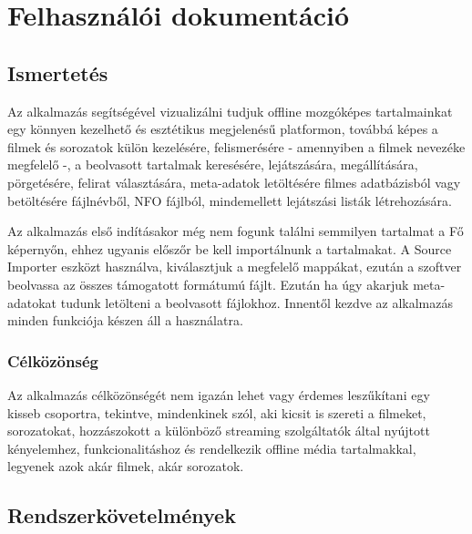 \chapter{Felhasználói dokumentáció} %
\label{ch:user}

\section{Ismertetés}
Az alkalmazás segítségével vizualizálni tudjuk offline mozgóképes tartalmainkat egy könnyen kezelhető és esztétikus megjelenésű platformon, továbbá képes a filmek és sorozatok külön kezelésére, felismerésére - amennyiben a filmek nevezéke megfelelő -, a beolvasott tartalmak keresésére, lejátszására, megállítására, pörgetésére, felirat választására, meta-adatok letöltésére filmes adatbázisból vagy betöltésére fájlnévből, NFO fájlból, mindemellett lejátszási listák létrehozására.

Az alkalmazás első indításakor még nem fogunk találni semmilyen tartalmat a Fő képernyőn, ehhez ugyanis előszőr be kell importálnunk a tartalmakat. A Source Importer eszközt használva, kiválasztjuk a megfelelő mappákat, ezután a szoftver beolvassa az összes támogatott formátumú fájlt. Ezután ha úgy akarjuk meta-adatokat tudunk letölteni a beolvasott fájlokhoz. Innentől kezdve az alkalmazás minden funkciója készen áll a használatra.

\subsection{Célközönség}
Az alkalmazás célközönségét nem igazán lehet vagy érdemes leszűkítani egy kisseb csoportra, tekintve, mindenkinek szól, aki kicsit is szereti a filmeket, sorozatokat, hozzászokott a különböző streaming szolgáltatók által nyújtott kényelemhez, funkcionalitáshoz és rendelkezik offline média tartalmakkal, legyenek azok akár filmek, akár sorozatok.

\section{Rendszerkövetelmények}
